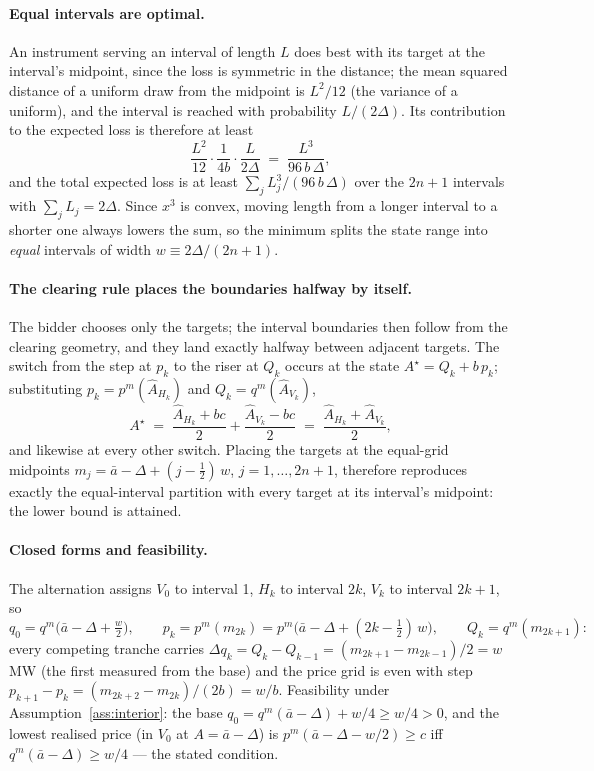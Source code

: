 \documentclass[11pt,a4paper]{article}
\theoremstyle{definition}
\theoremstyle{remark}
\theoremstyle{plain}
\begin{document}
\paragraph{Equal intervals are optimal.} An instrument serving an interval of length $L$ does best with its target at the interval's midpoint, since the loss is symmetric in the distance; the mean squared distance of a uniform draw from the midpoint is $L^2/12$ (the variance of a uniform), and the interval is reached with probability $L/(2\Delta)$. Its contribution to the expected loss is therefore at least
\[
\frac{L^2}{12} \cdot \frac{1}{4 b} \cdot \frac{L}{2\Delta} \;=\; \frac{L^3}{96\, b\, \Delta},
\]
and the total expected loss is at least $\sum_j L_j^3/(96\, b\, \Delta)$ over the $2n+1$ intervals with $\sum_j L_j = 2\Delta$. Since $x^3$ is convex, moving length from a longer interval to a shorter one always lowers the sum, so the minimum splits the state range into \emph{equal} intervals of width $w \equiv 2\Delta/(2n+1)$.

\paragraph{The clearing rule places the boundaries halfway by itself.} The bidder chooses only the targets; the interval boundaries then follow from the clearing geometry, and they land exactly halfway between adjacent targets. The switch from the step at $p_k$ to the riser at $Q_k$ occurs at the state $A^\star = Q_k + b\,p_k$; substituting $p_k = p^m(\hat A_{H_k})$ and $Q_k = q^m(\hat A_{V_k})$,
\[
A^\star \;=\; \frac{\hat A_{H_k} + bc}{2} + \frac{\hat A_{V_k} - bc}{2} \;=\; \frac{\hat A_{H_k} + \hat A_{V_k}}{2},
\]
and likewise at every other switch. Placing the targets at the equal-grid midpoints $m_j = \bar a - \Delta + (j - \tfrac12)\,w$, $j = 1, \dots, 2n+1$, therefore reproduces exactly the equal-interval partition with every target at its interval's midpoint: the lower bound is attained.

\paragraph{Closed forms and feasibility.} The alternation assigns $V_0$ to interval 1, $H_k$ to interval $2k$, $V_k$ to interval $2k{+}1$, so
\[
q_0 = q^m\!\bigl(\bar a - \Delta + \tfrac{w}{2}\bigr), \qquad
p_k = p^m(m_{2k}) = p^m\!\bigl(\bar a - \Delta + (2k - \tfrac12)\,w\bigr), \qquad
Q_k = q^m(m_{2k+1}):
\]
every competing tranche carries $\Delta q_k = Q_k - Q_{k-1} = (m_{2k+1} - m_{2k-1})/2 = w$ MW (the first measured from the base) and the price grid is even with step $p_{k+1} - p_k = (m_{2k+2} - m_{2k})/(2b) = w/b$. Feasibility under Assumption~\ref{ass:interior}: the base $q_0 = q^m(\bar a - \Delta) + w/4 \ge w/4 > 0$, and the lowest realised price (in $V_0$ at $A = \bar a - \Delta$) is $p^m(\bar a - \Delta - w/2) \ge c$ iff $q^m(\bar a - \Delta) \ge w/4$ --- the stated condition.
\end{document}
